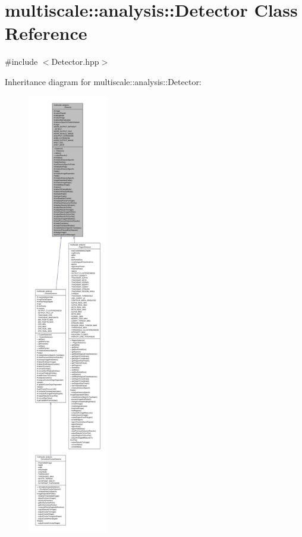 \hypertarget{classmultiscale_1_1analysis_1_1Detector}{\section{multiscale\-:\-:analysis\-:\-:Detector Class Reference}
\label{classmultiscale_1_1analysis_1_1Detector}
}


{\ttfamily \#include $<$Detector.\-hpp$>$}



Inheritance diagram for multiscale\-:\-:analysis\-:\-:Detector\-:
\nopagebreak
\begin{figure}[H]
\begin{center}
\leavevmode
\includegraphics[height=550pt]{classmultiscale_1_1analysis_1_1Detector__inherit__graph}
\end{center}
\end{figure}


